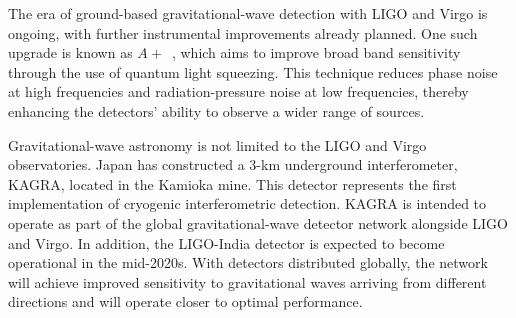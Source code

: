 The era of ground-based gravitational-wave detection with LIGO and Virgo is ongoing, with further instrumental improvements already planned.
One such upgrade is known as $A+$~\cite{cooper_sensors_2023}, which aims to improve broad band sensitivity through the use of quantum light squeezing.
This technique reduces phase noise at high frequencies and radiation-pressure noise at low frequencies, thereby enhancing the detectors' ability to observe a wider range of sources\cite{miller_new_2019}.

Gravitational-wave astronomy is not limited to the LIGO and Virgo observatories.
Japan has constructed a $3$-km underground interferometer, KAGRA, located in the Kamioka mine\cite{_kagra_,ooba_kagra_,akutsu_kagra_2019}.
This detector represents the first implementation of cryogenic interferometric detection.
KAGRA is intended to operate as part of the global gravitational-wave detector network alongside LIGO and Virgo\cite{ohashimasatake_ligo_}.
In addition, the LIGO-India detector is expected to become operational in the mid-2020s.
With detectors distributed globally, the network will achieve improved sensitivity to gravitational waves arriving from different directions and will operate closer to optimal performance\cite{miller_new_2019}.

